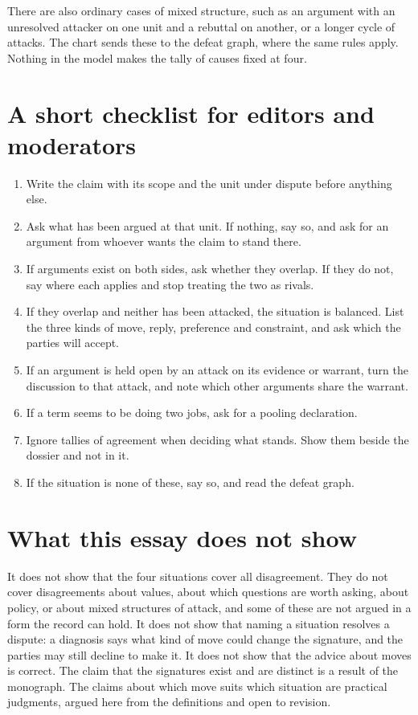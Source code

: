 \documentclass[11pt]{article}
\begin{document}
There are also ordinary cases of mixed structure, such as an argument with an unresolved attacker on one unit and a rebuttal on another, or a longer cycle of attacks. The chart sends these to the defeat graph, where the same rules apply. Nothing in the model makes the tally of causes fixed at four.

\section{A short checklist for editors and moderators}

\begin{enumerate}[nosep]
\item Write the claim with its scope and the unit under dispute before anything else.
\item Ask what has been argued at that unit. If nothing, say so, and ask for an argument from whoever wants the claim to stand there.
\item If arguments exist on both sides, ask whether they overlap. If they do not, say where each applies and stop treating the two as rivals.
\item If they overlap and neither has been attacked, the situation is balanced. List the three kinds of move, reply, preference and constraint, and ask which the parties will accept.
\item If an argument is held open by an attack on its evidence or warrant, turn the discussion to that attack, and note which other arguments share the warrant.
\item If a term seems to be doing two jobs, ask for a pooling declaration.
\item Ignore tallies of agreement when deciding what stands. Show them beside the dossier and not in it.
\item If the situation is none of these, say so, and read the defeat graph.
\end{enumerate}

\section{What this essay does not show}\label{sec:limits}

It does not show that the four situations cover all disagreement. They do not cover disagreements about values, about which questions are worth asking, about policy, or about mixed structures of attack, and some of these are not argued in a form the record can hold. It does not show that naming a situation resolves a dispute: a diagnosis says what kind of move could change the signature, and the parties may still decline to make it. It does not show that the advice about moves is correct. The claim that the signatures exist and are distinct is a result of the monograph. The claims about which move suits which situation are practical judgments, argued here from the definitions and open to revision.
\end{document}
